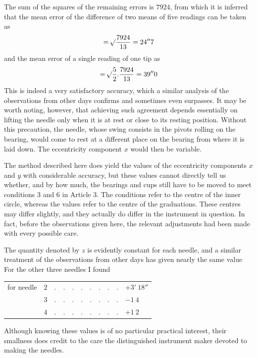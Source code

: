 The sum of the squares of the remaining errors is $7924$, from which it is inferred that the mean error of the difference of two means of five readings can be taken as
\[
=\mathord{{}^{}\!\surd}\frac{7924}{13}=24''7
\]
and the mean error of a single reading of one tip as
\[
=\mathord{{}^{}\!\surd}\frac{5}{2}.\frac{7924}{13}=39''0
\]
This is indeed a very satisfactory accuracy, which a similar analysis of the observations from other days confirms and sometimes even surpasses. It may be worth noting, however, that achieving such agreement depends essentially on lifting the needle only when it is at rest or close to its resting position. Without this precaution, the needle, whose swing consists in the pivots rolling on the bearing, would come to rest at a different place on the bearing from where it is laid down. The eccentricity component $x$ would then be variable.

The method described here does yield the values of the eccentricity components $x$ and $y$ with considerable accuracy, but these values
cannot directly tell us whether, and by how much, the bearings and cups still have to be moved to meet conditions 3 and 6 in Article 3. The conditions refer to the centre of the inner circle, whereas the values refer to the centre of the graduations. These centres may differ slightly, and they actually do differ in the instrument in question. In fact, before the observations given here, the relevant adjustments had been made with every possible care.

The quantity denoted by $z$ is evidently constant for each needle, and a similar treatment of the observations from other days has given nearly the same value For the other three needles I found
\begin{center}
\begin{tabular}{crll}
for needle&$2$&$.\quad.\quad.\quad.\quad.\quad.\quad.\quad.$&$+3'\ 18''$\\
&$3$&$.\quad.\quad.\quad.\quad.\quad.\quad.\quad.$&$-1\ 4$\\
&$4$&$.\quad.\quad.\quad.\quad.\quad.\quad.\quad.$&$+1\ 2$
\end{tabular}
\end{center}

Although knowing these values is of no particular practical interest, their smallness does credit to the care the distinguished instrument maker devoted to making the needles.

